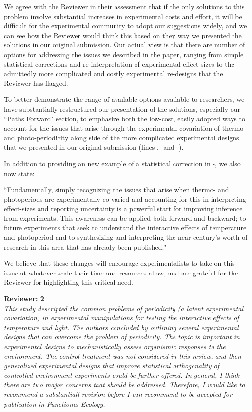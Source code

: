 \documentclass[11pt]{article}
\begin{document}
 We agree with the Reviewer in their assessment that if the only solutions to this problem involve substantial increases in experimental costs and effort, it will be difficult for the experimental community to adopt our suggestions widely, and we can see how the Reviewer would think this based on they way we presented the solutions in our original submission. Our actual view is that there are number of options for addressing the issues we described in the paper, ranging from simple statistical corrections and re-interpretation of experimental effect sizes to the admittedly more complicated and costly experimental re-designs that the Reviewer has flagged.
 
To better demonstrate the range of available options available to researchers, we have substantially restructured our presentation of the solutions, especially our ``Paths Forward" section, to emphasize both the low-cost, easily adopted ways to account for the issues that arise through the experimental covariation of thermo- and photo-periodicity along side of the more complicated experimental designs that we presented in our original submission (lines ,- and -). 

In addition to providing an new example of a statistical correction in -, we also now state:

``Fundamentally, simply recognizing the issues that arise when thermo- and photoperiods are experimentally co-varied and accounting for this in interpreting effect-sizes and reporting uncertainty is a powerful start for improving inference from experiments. This awareness can be applied both forward and backward; to future experiments that seek to understand the interactive effects of temperature and photoperiod and to synthesizing and interpreting the near-century's worth of research in this area that has already been published."

We believe that these changes will encourage experimentalists to take on this issue at whatever scale their time and resources allow, and are grateful for the Reviewer for highlighting this critical need.

\textbf{Reviewer: 2}\\
\emph{This study descripted the common problems of periodicity (a latent experimental covariation) in experimental manipulations for testing the interactive effects of temperature and light. The authors concluded by outlining several experimental designs that can overcome the problem of periodicity. The topic is important in experimental designs to mechanistically assess organismic responses to the environment. The control treatment was not considered in this review, and then generalized experimental designs that improve statistical orthogonality of controlled environment experiments could be further offered. In general, I think there are two major concerns that should be addressed. Therefore, I would like to recommend a substantiall revision before I can recommend to be accepted for publication in Functional Ecology.}
\end{document}
